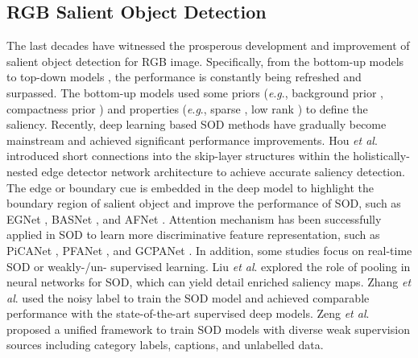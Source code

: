 \documentclass[journal]{IEEEtran}
\newcommand{\etal}{\textit{et al}.}
\newcommand{\eg}{\textit{e}.\textit{g}.}
\begin{document}
\subsection{RGB Salient Object Detection}
The last decades have witnessed the prosperous development and improvement of salient object detection for RGB image. Specifically, from the bottom-up models \cite{DSR,RBD,DCLC,SMD} to top-down models \cite{DSS,deng2018r3net,liu2018picanet,Liu2019PoolSal,Qin_2019_CVPR,zhao2019EGNet,feng2019attentive,PFANet,GCPANet,Unsupervised,weaksupervised}, the performance is constantly being refreshed and surpassed. The bottom-up models used some priors (\eg, background prior \cite{RBD}, compactness prior \cite{DCLC} ) and properties (\eg, sparse \cite{DSR}, low rank \cite{SMD}) to define the saliency. Recently, deep learning based SOD methods have gradually become mainstream and achieved significant performance improvements.
Hou \etal \cite{DSS} introduced short connections into the skip-layer structures within the holistically-nested edge detector network architecture to achieve accurate saliency detection.
The edge or boundary cue is embedded in the deep model to highlight the boundary region of salient object and improve the performance of SOD, such as EGNet \cite{zhao2019EGNet}, BASNet \cite{Qin_2019_CVPR}, and AFNet \cite{feng2019attentive}.
Attention mechanism has been successfully applied in SOD to learn more discriminative feature representation, such as PiCANet \cite{liu2018picanet}, PFANet \cite{PFANet}, and GCPANet \cite{GCPANet}.
In addition, some studies focus on real-time SOD or weakly-/un- supervised learning. Liu \etal \cite{Liu2019PoolSal} explored the role of pooling in neural networks for SOD, which can yield detail enriched saliency maps. Zhang \etal \cite{Unsupervised} used the noisy label to train the SOD model and achieved comparable performance with the state-of-the-art supervised deep models. Zeng \etal \cite{weaksupervised} proposed a unified framework to train SOD models with diverse weak supervision sources including category labels, captions, and unlabelled data.
\end{document}
